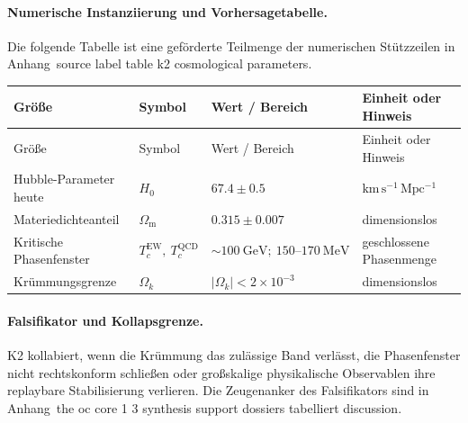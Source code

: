 \paragraph{Numerische Instanziierung und Vorhersagetabelle.}
Die folgende Tabelle ist eine geförderte Teilmenge der numerischen Stützzeilen in Anhang~source label table k2 cosmological parameters.
\begin{longtable}{@{}L{0.27\textwidth}L{0.15\textwidth}L{0.24\textwidth}L{0.16\textwidth}@{}}
\toprule
Größe & Symbol & Wert / Bereich & Einheit oder Hinweis \\
\midrule
\endfirsthead
\toprule
Größe & Symbol & Wert / Bereich & Einheit oder Hinweis \\
\midrule
\endhead
Hubble-Parameter heute & $\scriptstyle H_0$ & $67.4 \pm 0.5$ & $\mathrm{km\,s^{-1}\,Mpc^{-1}}$ \\
Materiedichteanteil & $\scriptstyle \Omega_{\mathrm{m}}$ & $0.315 \pm 0.007$ & dimensionslos \\
Kritische Phasenfenster & $\scriptstyle T_c^{\mathrm{EW}},\allowbreak \ T_c^{\mathrm{QCD}}$ & $\sim 100\ \mathrm{GeV};\allowbreak \ 150\text{--}170\ \mathrm{MeV}$ & geschlossene Phasenmenge \\
Krümmungsgrenze & $\scriptstyle \Omega_k$ & $|\Omega_k| < 2 \times 10^{-3}$ & dimensionslos \\
\bottomrule
\end{longtable}

\paragraph{Falsifikator und Kollapsgrenze.}
K2 kollabiert, wenn die Krümmung das zulässige Band verlässt, die Phasenfenster nicht rechtskonform schließen oder großskalige physikalische Observablen ihre replaybare Stabilisierung verlieren.
Die Zeugenanker des Falsifikators sind in Anhang~the oc core 1 3 synthesis support dossiers tabelliert discussion.

